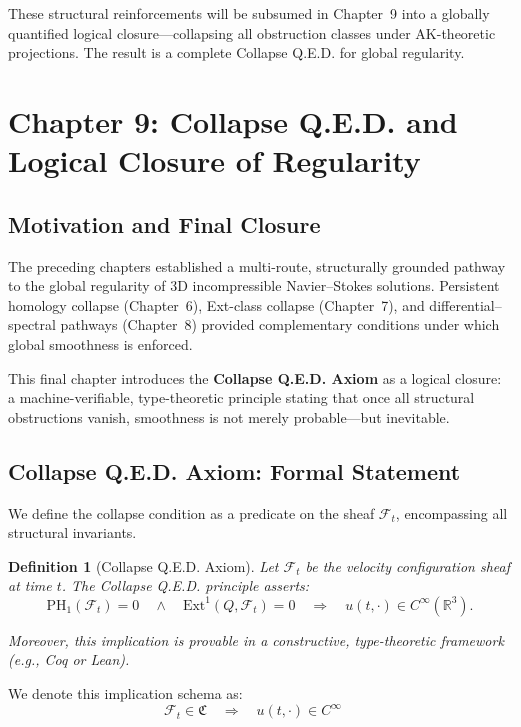 \documentclass[11pt]{article}
\newtheorem{definition}[theorem]{Definition}
\begin{document}
These structural reinforcements will be subsumed in Chapter~9 into a globally quantified logical closure—collapsing all obstruction classes under AK-theoretic projections. The result is a complete Collapse Q.E.D. for global regularity.



\section{Chapter 9: Collapse Q.E.D. and Logical Closure of Regularity}
\label{sec:collapse-qed}

\subsection{Motivation and Final Closure}

The preceding chapters established a multi-route, structurally grounded pathway to the global regularity of 3D incompressible Navier--Stokes solutions. Persistent homology collapse (Chapter~6), Ext-class collapse (Chapter~7), and differential–spectral pathways (Chapter~8) provided complementary conditions under which global smoothness is enforced.

This final chapter introduces the \textbf{Collapse Q.E.D. Axiom} as a logical closure: a machine-verifiable, type-theoretic principle stating that once all structural obstructions vanish, smoothness is not merely probable—but inevitable.

\subsection{Collapse Q.E.D. Axiom: Formal Statement}

We define the collapse condition as a predicate on the sheaf \( \mathcal{F}_t \), encompassing all structural invariants.

\begin{definition}[Collapse Q.E.D. Axiom]
Let \( \mathcal{F}_t \) be the velocity configuration sheaf at time \( t \). The Collapse Q.E.D. principle asserts:
\[
\mathrm{PH}_1(\mathcal{F}_t) = 0 \quad \wedge \quad \mathrm{Ext}^1(Q, \mathcal{F}_t) = 0 \quad \Rightarrow \quad u(t,\cdot) \in C^\infty(\mathbb{R}^3).
\]

Moreover, this implication is provable in a constructive, type-theoretic framework (e.g., Coq or Lean).
\end{definition}

We denote this implication schema as:
\[
\mathcal{F}_t \in \mathfrak{C} \quad \Rightarrow \quad u(t, \cdot) \in C^\infty \quad \tag{Collapse Q.E.D.}
\]
\end{document}
